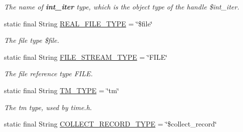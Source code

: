 \begin{DoxyCompactItemize}
\begin{DoxyCompactList}\small\item\em The name of {\bfseries int\+\_\+iter} type, which is the object type of the handle \$int\+\_\+iter. \end{DoxyCompactList}\item 
\hypertarget{classedu_1_1udel_1_1cis_1_1vsl_1_1civl_1_1model_1_1IF_1_1ModelConfiguration_a039721436dd715ea626d955c56dc61c6}{}static final String \hyperlink{classedu_1_1udel_1_1cis_1_1vsl_1_1civl_1_1model_1_1IF_1_1ModelConfiguration_a039721436dd715ea626d955c56dc61c6}{R\+E\+A\+L\+\_\+\+F\+I\+L\+E\+\_\+\+T\+Y\+P\+E} = \char`\"{}\$file\char`\"{}\label{classedu_1_1udel_1_1cis_1_1vsl_1_1civl_1_1model_1_1IF_1_1ModelConfiguration_a039721436dd715ea626d955c56dc61c6}

\begin{DoxyCompactList}\small\item\em The file type \$file. \end{DoxyCompactList}\item 
\hypertarget{classedu_1_1udel_1_1cis_1_1vsl_1_1civl_1_1model_1_1IF_1_1ModelConfiguration_a25aea7f2df26cbb26b663b2e63098893}{}static final String \hyperlink{classedu_1_1udel_1_1cis_1_1vsl_1_1civl_1_1model_1_1IF_1_1ModelConfiguration_a25aea7f2df26cbb26b663b2e63098893}{F\+I\+L\+E\+\_\+\+S\+T\+R\+E\+A\+M\+\_\+\+T\+Y\+P\+E} = \char`\"{}F\+I\+L\+E\char`\"{}\label{classedu_1_1udel_1_1cis_1_1vsl_1_1civl_1_1model_1_1IF_1_1ModelConfiguration_a25aea7f2df26cbb26b663b2e63098893}

\begin{DoxyCompactList}\small\item\em The file reference type F\+I\+L\+E. \end{DoxyCompactList}\item 
\hypertarget{classedu_1_1udel_1_1cis_1_1vsl_1_1civl_1_1model_1_1IF_1_1ModelConfiguration_a834787a6360966216e1db1128bdf55c5}{}static final String \hyperlink{classedu_1_1udel_1_1cis_1_1vsl_1_1civl_1_1model_1_1IF_1_1ModelConfiguration_a834787a6360966216e1db1128bdf55c5}{T\+M\+\_\+\+T\+Y\+P\+E} = \char`\"{}tm\char`\"{}\label{classedu_1_1udel_1_1cis_1_1vsl_1_1civl_1_1model_1_1IF_1_1ModelConfiguration_a834787a6360966216e1db1128bdf55c5}

\begin{DoxyCompactList}\small\item\em The tm type, used by time.\+h. \end{DoxyCompactList}\item 
\hypertarget{classedu_1_1udel_1_1cis_1_1vsl_1_1civl_1_1model_1_1IF_1_1ModelConfiguration_a4444ab042c49bcde0c2997c6d8cfb130}{}static final String \hyperlink{classedu_1_1udel_1_1cis_1_1vsl_1_1civl_1_1model_1_1IF_1_1ModelConfiguration_a4444ab042c49bcde0c2997c6d8cfb130}{C\+O\+L\+L\+E\+C\+T\+\_\+\+R\+E\+C\+O\+R\+D\+\_\+\+T\+Y\+P\+E} = \char`\"{}\$collect\+\_\+record\char`\"{}\label{classedu_1_1udel_1_1cis_1_1vsl_1_1civl_1_1model_1_1IF_1_1ModelConfiguration_a4444ab042c49bcde0c2997c6d8cfb130}


\end{DoxyCompactItemize}
